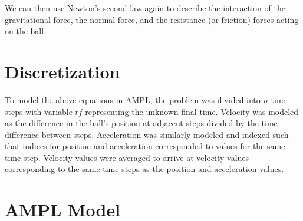 \documentclass{article}
\begin{document}
We can then use Newton's second law again to describe the interaction of the gravitational force, the normal force, and the resistance (or friction) forces acting on the ball.

\section{Discretization}\label{Discretization}

To model the above equations in AMPL, the problem was divided into \(n\) time steps with variable \(tf\) representing the unknown final time. Velocity was modeled as the difference in the ball's position at adjacent steps divided by the time difference between steps. Acceleration was similarly modeled and indexed such that indices for position and acceleration corresponded to values for the same time step. Velocity values were averaged to arrive at velocity values corresponding to the same time steps as the position and acceleration values.

\section{AMPL Model}\label{AMPL Model}
\end{document}
